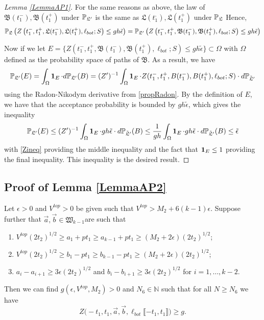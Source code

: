 \begin{proof}[Lemma \ref{LemmaAP1}]
	For the same reasons as above, the law of $\mathfrak B(t_1^-), \mathfrak{B}(t_1^+)$ under $\mathbb{P}_{\mathfrak L'}$ is the same as $\mathfrak L(t_1^,), \mathfrak L(t_1^+)$ under $\mathbb{P}_{\mathfrak L}$ Hence,
	\begin{equation}
	\mathbb{P}_{\mathfrak L}\left(Z\left(t_1^-,t_1^+,\mathfrak L(t_1^-),\mathfrak L(t_1^+),\ell_{bot};S\right)\leq gh\tilde \epsilon\right)=\mathbb{P}_{\mathfrak L'}\left(Z\left(t_1^-,t_1^+,\mathfrak B(t_1^-),\mathfrak B(t_1^+),\ell_{bot};S\right)\leq gh\tilde \epsilon\right)
	\end{equation}
	
	Now if we let $E=\{Z(t_1^-,t_1^+,\mathfrak{B}(t_1^-),\mathfrak{B}(t_1^+),\ell_{bot};S)\leq gh\tilde\epsilon\}\subset \Omega$ with $\Omega$ defined as the probability space of paths of $\mathfrak B$. As a result, we have 
	\[
	\mathbb{P}_{\mathfrak L'}(E)=\int_\Omega \operatorname{\mathbf{1}}_E\cdot d\mathbb{P}_{\mathfrak L'}(B)=(Z')^{-1}\int_\Omega\operatorname{\mathbf{1}}_E\cdot Z(t_1^-,t_1^+,B(t_1^-),B(t_1^+),\ell_{bot};S)\cdot d\mathbb{P}_{\tilde{\mathfrak{L}}'}
	\]
	using the Radon-Nikodym derivative from \ref{propRadon}. By the definition of $E$, we have that the acceptance probability is bounded by $gh\tilde{\epsilon}$, which gives the inequality \[\mathbb{P}_{\mathfrak L'}(E)\leq (Z')^{-1}\int_\Omega \operatorname{\mathbf{1}}_E\cdot gh\tilde{\epsilon}\cdot d\mathbb{P}_{\tilde{\mathfrak{L}}'}(B)\leq \frac{1}{gh}\int_\Omega\operatorname{\mathbf{1}}_E\cdot gh\tilde\epsilon\cdot d\mathbb{P}_{\tilde{\mathfrak{L}}'}(B)\leq \tilde{\epsilon}\] with \ref{Zineq}  providing the middle inequality and the fact that $\operatorname{\mathbf{1}}_E\leq 1$ providing the final inequality. This inequality is the desired result.
	
\end{proof}

\subsection{Proof of Lemma \ref{LemmaAP2}}


\begin{lemma}\label{LemmaBP1} Let $\epsilon > 0$ and $V^{top} > 0$ be given such that $V^{top} > M_2 + 6 (k-1) \epsilon$. Suppose further that $\vec{a}, \vec{b} \in \mathfrak{W}_{k-1}$are such that 
	\begin{enumerate}
		\item $V^{top} (2t_2)^{1/2} \geq a_1 + p t_1 \geq a_{k-1} + pt_1 \geq (M_2 + 2 \epsilon) (2t_2)^{1/2}$;
		\item $V^{top} (2t_2)^{1/2} \geq b_1 - p t_1 \geq b_{k-1} - pt_1 \geq (M_2 + 2 \epsilon) (2t_2)^{1/2}$; 
		\item $a_i -a_{i+1} \geq 3\epsilon (2t_2)^{1/2}$ and $b_{i} - b_{i+1} \geq 3 \epsilon (2t_2)^{1/2}$ for $i = 1, \dots, k-2$.
	\end{enumerate}
	Then we can find $g(\epsilon, V^{top}, M_2) > 0$ and $N_6 \in \mathbb{N}$ such that for all $N \geq N_6$ we have 
	\begin{equation}\label{eqnRT}
	Z\big(  -t_1, t_1, \vec{a} ,\vec{b}, \ell_{bot}\llbracket -t_1, t_1\rrbracket\big) \geq g.
	\end{equation}
\end{lemma}

